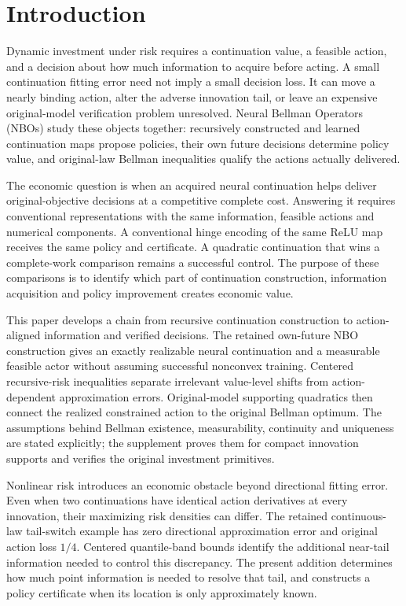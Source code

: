 \section{Introduction}\label{sec:intro119}
Dynamic investment under risk requires a continuation value, a feasible action,
and a decision about how much information to acquire before acting. A small
continuation fitting error need not imply a small decision loss. It can move a
nearly binding action, alter the adverse innovation tail, or leave an expensive
original-model verification problem unresolved. Neural Bellman Operators (NBOs)
study these objects together: recursively constructed and learned continuation
maps propose policies, their own future decisions determine policy value, and
original-law Bellman inequalities qualify the actions actually delivered.

The economic question is when an acquired neural continuation helps deliver
original-objective decisions at a competitive complete cost. Answering it
requires conventional representations with the same information, feasible
actions and numerical components. A conventional hinge encoding of the same
ReLU map receives the same policy and certificate. A quadratic continuation
that wins a complete-work comparison remains a successful control. The purpose
of these comparisons is to identify which part of continuation construction,
information acquisition and policy improvement creates economic value.

This paper develops a chain from recursive continuation construction to
action-aligned information and verified decisions. The retained own-future NBO
construction gives an exactly realizable neural continuation and a measurable
feasible actor without assuming successful nonconvex training. Centered
recursive-risk inequalities separate irrelevant value-level shifts from
action-dependent approximation errors. Original-model supporting quadratics
then connect the realized constrained action to the original Bellman optimum.
The assumptions behind Bellman existence, measurability, continuity and
uniqueness are stated explicitly; the supplement proves them for compact
innovation supports and verifies the original investment primitives.

Nonlinear risk introduces an economic obstacle beyond directional fitting
error. Even when two continuations have identical action derivatives at every
innovation, their maximizing risk densities can differ. The retained
continuous-law tail-switch example has zero directional approximation error
and original action loss $1/4$. Centered quantile-band bounds identify the
additional near-tail information needed to control this discrepancy. The
present addition determines how much point information is needed to resolve
that tail, and constructs a policy certificate when its location is only
approximately known.

